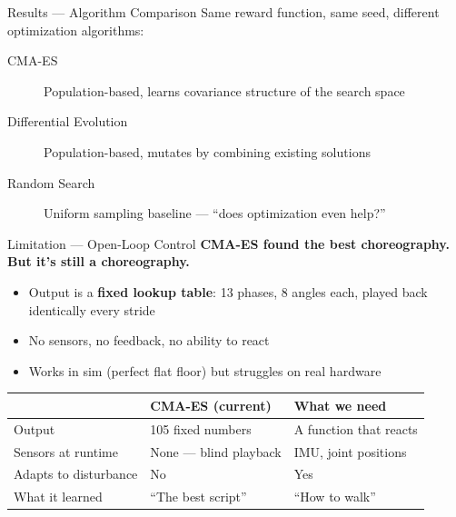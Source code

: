 \documentclass[aspectratio=169]{beamer}
\begin{document}
\begin{frame}{Results --- Algorithm Comparison}
Same reward function, same seed, different optimization algorithms:

\vspace{0.3em}
\begin{description}
    \item[CMA-ES] Population-based, learns covariance structure of the search space
    \item[Differential Evolution] Population-based, mutates by combining existing solutions
    \item[Random Search] Uniform sampling baseline --- ``does optimization even help?''
\end{description}

\vspace{0.5em}

\vspace{0.3em}
\end{frame}

\begin{frame}{Limitation --- Open-Loop Control}
\textbf{CMA-ES found the best choreography. But it's still a choreography.}

\vspace{0.5em}
\begin{itemize}
    \item Output is a \textbf{fixed lookup table}: 13 phases, 8 angles each, played back identically every stride
    \item No sensors, no feedback, no ability to react
    \item Works in sim (perfect flat floor) but struggles on real hardware
\end{itemize}

\vspace{0.5em}
\begin{tabular}{lll}
    \toprule
    & CMA-ES (current) & What we need \\
    \midrule
    Output              & 105 fixed numbers       & A function that reacts \\
    Sensors at runtime  & None --- blind playback  & IMU, joint positions \\
    Adapts to disturbance & No                     & Yes \\
    What it learned     & ``The best script''      & ``How to walk'' \\
    \bottomrule
\end{tabular}
\end{frame}
\end{document}
